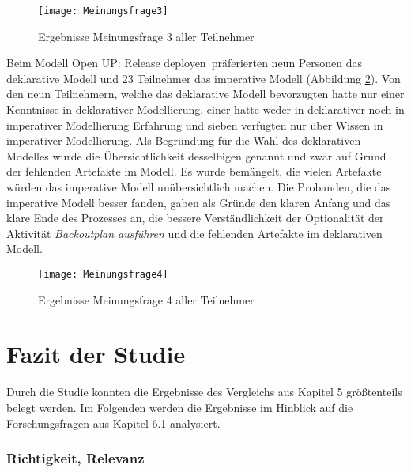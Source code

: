 \begin{figure}[htp]
\begin{center}
  \texttt{[image: Meinungsfrage3]} %
  \caption{Ergebnisse Meinungsfrage 3 aller Teilnehmer}
  \label{fig:Meinungsfrage3}
\end{center}
\end{figure}

Beim Modell \grqq Open UP: Release deployen\grqq \ präferierten neun Personen das deklarative Modell und 23 Teilnehmer das imperative Modell (Abbildung \ref{fig:Meinungsfrage4}). Von den neun Teilnehmern, welche das deklarative Modell bevorzugten hatte nur einer Kenntnisse in deklarativer Modellierung, einer hatte weder in deklarativer noch in imperativer Modellierung Erfahrung und sieben verfügten nur über Wissen in imperativer Modellierung. \newline
Als Begründung für die Wahl des deklarativen Modelles wurde die Übersichtlichkeit desselbigen genannt und zwar auf Grund der fehlenden Artefakte im Modell. Es wurde bemängelt, die vielen Artefakte würden das imperative Modell unübersichtlich machen.\newline
Die Probanden, die das imperative Modell besser fanden, gaben als Gründe den klaren Anfang und das klare Ende des Prozesses an, die bessere Verständlichkeit der Optionalität der Aktivität \textit{Backoutplan ausführen} und die fehlenden Artefakte im deklarativen Modell. \newline



\begin{figure}[htp]
\begin{center}
  \texttt{[image: Meinungsfrage4]} %
  \caption{Ergebnisse Meinungsfrage 4 aller Teilnehmer}
  \label{fig:Meinungsfrage4}
\end{center}
\end{figure}


\clearpage

\section{Fazit der Studie}

Durch die Studie konnten die Ergebnisse des Vergleichs aus Kapitel 5 größtenteils belegt werden. Im Folgenden werden die Ergebnisse im Hinblick auf die Forschungsfragen aus Kapitel 6.1 analysiert.\newline

\subsubsection{Richtigkeit, Relevanz}


